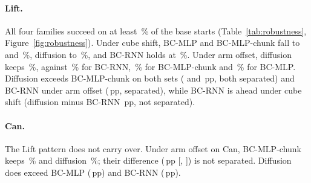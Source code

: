 \paragraph{Lift.} All four families succeed on at least \,\% of
the base starts (Table~\ref{tab:robustness}, Figure~\ref{fig:robustness}). Under cube shift,
BC-MLP and BC-MLP-chunk fall to  and
\,\%, diffusion to \,\%, and BC-RNN
holds at \,\%. Under arm offset, diffusion keeps
\,\%, against \,\% for BC-RNN,
\,\% for BC-MLP-chunk and \,\% for
BC-MLP. Diffusion exceeds BC-MLP-chunk on both sets ( and
\,pp, both separated) and BC-RNN under arm offset
(\,pp, separated), while BC-RNN is ahead under cube shift
(diffusion minus BC-RNN \,pp, not separated).

\paragraph{Can.} The Lift pattern does not carry over. Under arm offset on Can, BC-MLP-chunk
keeps \,\% and diffusion \,\%; their
difference (\,pp [,
]) is not separated. Diffusion does exceed BC-MLP
(\,pp) and BC-RNN (\,pp).


